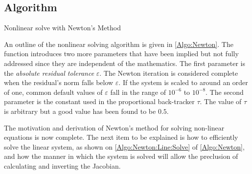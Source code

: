 \documentclass[12pt]{UWMadThesis}
\begin{document}
\subsection{Algorithm}

\begin{algorithm}[t]
    \caption{Nonlinear solve with Newton's Method}
    \label{Algo:Newton}
\end{algorithm}

An outline of the nonlinear solving algorithm is given in \cref{Algo:Newton}.
The function introduces two more parameters that have been implied but not fully addressed since they are independent of the mathematics.
The first parameter is the \textit{absolute residual tolerance} $\varepsilon$.
The Newton iteration is considered complete when the residual's norm falls below $\varepsilon$.
If the system is scaled to around an order of one, common default values of $\varepsilon$ fall in the range of $10^{-6}$ to $10^{-8}$.
The second parameter is the constant used in the proportional back-tracker $\tau$.
The value of $\tau$ is arbitrary but a good value has been found to be $0.5$.

The motivation and derivation of Newton's method for solving non-linear equations is now complete.
The next item to be explained is how to efficiently solve the linear system, as shown on \cref{Algo:Newton:Line:Solve} of \cref{Algo:Newton}, and how the manner in which the system is solved will allow the preclusion of calculating and inverting the Jacobian.
\end{document}
